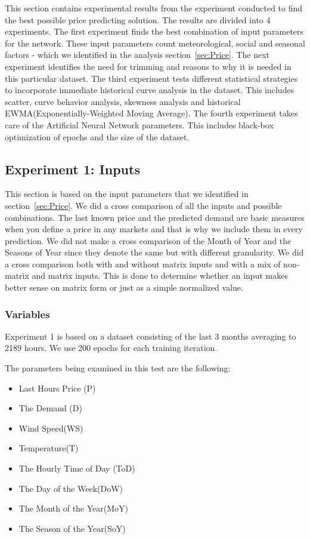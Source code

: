 This section contains experimental results from the experiment conducted to find the best possible price predicting solution. The results are divided into 4 experiments. The first experiment finds the best combination of input parameters for the network. These input parameters count meteorological, social and seasonal factors - which we identified in the analysis section~\ref{sec:Price}. The next experiment identifies the need for trimming and reasons to why it is needed in this particular dataset. The third experiment tests different statistical strategies to incorporate immediate historical curve analysis in the dataset. This includes scatter, curve behavior analysis, skewness analysis and historical EWMA(Exponentially-Weighted Moving Average). The fourth experiment takes care of the Artificial Neural Network parameters. This includes black-box optimization of epochs and the size of the dataset.

\subsection{Experiment 1: Inputs}
This section is based on the input parameters that we identified in section~\ref{sec:Price}. We did a cross comparison of all the inputs and possible combinations. The last known price and the predicted demand are basic measures when you define a price in any markets and that is why we include them in every prediction. We did not make a cross comparison of the Month of Year and the Seasons of Year since they denote the same but with different granularity. We did a cross comparison both with and without matrix inputs and with a mix of non-matrix and matrix inputs. This is done to determine whether an input makes better sense on matrix form or just as a simple normalized value. 

\subsubsection{Variables}
Experiment 1 is based on a dataset consisting of the last 3 months averaging to 2189 hours. We use 200 epochs for each training iteration.

The parameters being examined in this test are the following:
\begin{itemize}
	\item Last Hours Price (P)
	\item The Demand (D)
	\item Wind Speed(WS)
	\item Temperature(T)
	\item The Hourly Time of Day (ToD)
	\item The Day of the Week(DoW)
	\item The Month of the Year(MoY)
	\item The Season of the Year(SoY)
\end{itemize}

